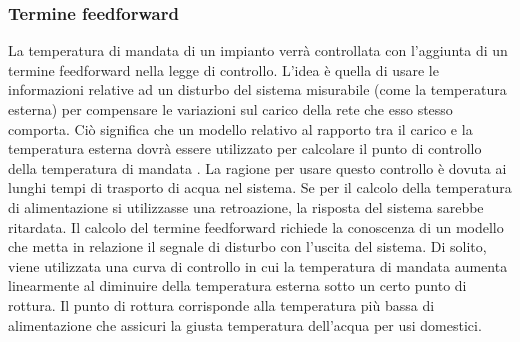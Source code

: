 \documentclass[laurea,oneside,11pt]{USiena_tesiLM3}
\begin{document}
\subsubsection{Termine feedforward}
La temperatura di mandata di un impianto verrà controllata con l'aggiunta di un termine feedforward nella legge di controllo. L'idea è quella di usare le informazioni relative ad un disturbo del sistema misurabile (come la temperatura esterna) per compensare le variazioni sul carico della rete che esso stesso comporta. Ciò significa che un modello relativo al rapporto tra il carico e la temperatura esterna dovrà essere utilizzato per calcolare il punto di controllo della temperatura di mandata \cite{arvastson2001stochastic}.
La ragione per usare questo controllo è dovuta ai lunghi tempi di trasporto di acqua nel sistema. Se per il calcolo della temperatura di alimentazione si utilizzasse una retroazione, la risposta del sistema sarebbe ritardata.
Il calcolo del termine feedforward richiede la conoscenza di un modello che metta in relazione  il segnale di disturbo con l'uscita del sistema. Di solito, viene utilizzata una curva di controllo in cui la temperatura di mandata aumenta linearmente al diminuire della temperatura esterna sotto un certo punto di rottura. Il punto di rottura corrisponde alla temperatura più bassa di alimentazione che assicuri la giusta temperatura dell'acqua per usi domestici. 
\end{document}
